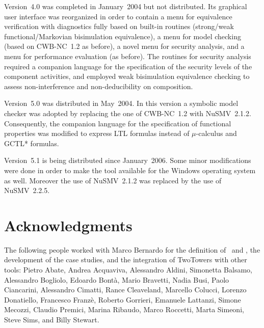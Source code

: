 Version~4.0 was completed in January~2004 but not distributed. Its graphical user interface was reorganized
in order to contain a menu for equivalence verification with diagnostics fully based on built-in routines
(strong/weak functional/Markovian bisimulation equivalence), a menu for model checking (based on CWB-NC~1.2
as before), a novel menu for security analysis, and a menu for performance evaluation (as before). The
routines for security analysis required a companion language for the specification of the security levels of
the component activities, and employed weak bisimulation equivalence checking to assess non-interference and
non-deducibility on composition.

Version~5.0 was distributed in May~2004. In this version a symbolic model checker was adopted by replacing
the one of CWB-NC~1.2 with NuSMV~2.1.2. Consequently, the companion language for the specification of
functional properties was modified to express LTL formulas instead of $\mu$-calculus and GCTL* formulas.

Version~5.1 is being distributed since January~2006. Some minor modifications were done in order to make the
tool available for the Windows operating system as well. Moreover the use of NuSMV~2.1.2 was replaced by the
use of NuSMV~2.2.5.



\section{Acknowledgments}

The following people worked with Marco Bernardo for the definition of \aemilia\ and \empagr, the development
of the case studies, and the integration of TwoTowers with other tools: Pietro Abate, Andrea Acquaviva,
Alessandro Aldini, Simonetta Balsamo, Alessandro Bogliolo, Edoardo Bont\`a, Mario Bravetti, Nadia Busi,
Paolo Ciancarini, Alessandro Cimatti, Rance Cleaveland, Marcello Colucci, Lorenzo Donatiello, Francesco
Franz\`e, Roberto Gorrieri, Emanuele Lattanzi, Simone Mecozzi, Claudio Premici, Marina Ribaudo, Marco
Roccetti, Marta Simeoni, Steve Sims, and Billy Stewart.
